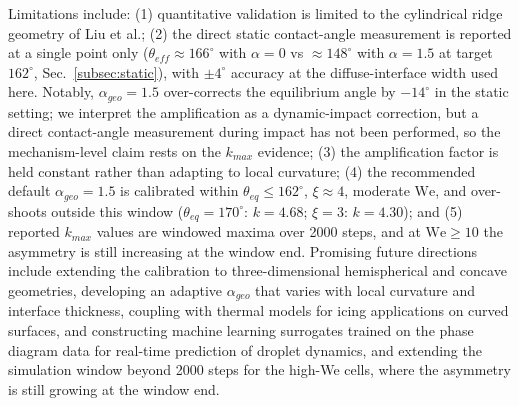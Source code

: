 Limitations include: (1) quantitative validation is limited to the cylindrical ridge geometry of Liu et al.; (2) the direct static contact-angle measurement is reported at a single point only ($\theta_{eff} \approx 166^\circ$ with $\alpha=0$ vs $\approx 148^\circ$ with $\alpha=1.5$ at target $162^\circ$, Sec.~\ref{subsec:static}), with $\pm 4^\circ$ accuracy at the diffuse-interface width used here. Notably, $\alpha_{geo}=1.5$ over-corrects the equilibrium angle by $-14^\circ$ in the static setting; we interpret the amplification as a dynamic-impact correction, but a direct contact-angle measurement during impact has not been performed, so the mechanism-level claim rests on the $k_{max}$ evidence; (3) the amplification factor is held constant rather than adapting to local curvature; (4) the recommended default $\alpha_{geo}=1.5$ is calibrated within $\theta_{eq}\leq 162^\circ$, $\xi\approx 4$, moderate $\mathrm{We}$, and over-shoots outside this window ($\theta_{eq}=170^\circ$: $k=4.68$; $\xi=3$: $k=4.30$); and (5) reported $k_{max}$ values are windowed maxima over 2000 steps, and at $\mathrm{We}\geq 10$ the asymmetry is still increasing at the window end. Promising future directions include extending the calibration to three-dimensional hemispherical and concave geometries, developing an adaptive $\alpha_{geo}$ that varies with local curvature and interface thickness, coupling with thermal models for icing applications on curved surfaces, and constructing machine learning surrogates trained on the phase diagram data for real-time prediction of droplet dynamics, and extending the simulation window beyond 2000 steps for the high-We cells, where the asymmetry is still growing at the window end.
